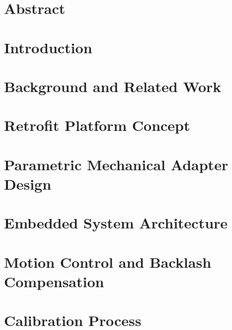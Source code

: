 \documentclass{article}
\begin{document}


\clearpage
{} %
\section*{Abstract}


\clearpage
\tableofcontents
\thispagestyle{empty}



\newpage
{} %
\section{Introduction}\label{sec:introduction}


\newpage
\section{Background and Related Work}\label{sec:relatedwork}


\newpage
\section{Retrofit Platform Concept}\label{sec:platform}


\newpage
\section{Parametric Mechanical Adapter Design}\label{sec:mechanical}


\newpage
\section{Embedded System Architecture}\label{sec:embedded}


\newpage
\section{Motion Control and Backlash Compensation}\label{sec:motion}


\newpage
\section{Calibration Process}\label{sec:calibration}

\end{document}
